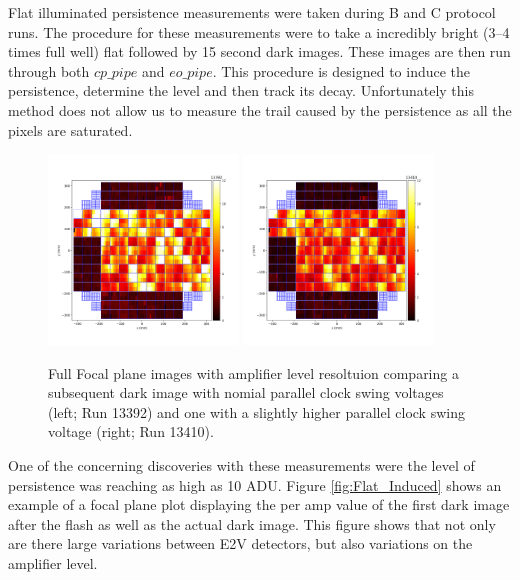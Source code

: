 \documentclass[DM,authoryear,toc]{lsstdoc}
\begin{document}
Flat illuminated persistence measurements were taken during B and C protocol runs.
The procedure for these measurements were to take a incredibly bright (3--4 times full well) flat followed by 15 second dark images.
These images are then run through both \texttt{$cp\_pipe$} and \texttt{$eo\_pipe$}.
This procedure is designed to induce the persistence, determine the level and then track its decay.
Unfortunately this method does not allow us to measure the trail caused by the persistence as all the pixels are saturated.

\begin{figure}[!htp]
  \centering
  \includegraphics[width=0.45\textwidth, angle=0]{Run_13392_Persistence.png}
  \includegraphics[width=0.45\textwidth, angle=0]{Run_13410_Persistence_Lower.png}
  \caption{
  Full Focal plane images with amplifier level resoltuion comparing a subsequent dark image with nomial parallel clock swing voltages (left; Run 13392) 
  and one with a slightly higher parallel clock swing voltage (right; Run 13410).
  }\label{fig:Flat_Induced_Comparison}
\end{figure}

One of the concerning discoveries with these measurements were the level of persistence was reaching as high as 10 ADU.
Figure \ref{fig:Flat_Induced} shows an example of a focal plane plot displaying the per amp value of the first dark image after the flash as well as the actual dark image.
This figure shows that not only are there large variations between E2V detectors, but also variations on the amplifier level.
\end{document}
